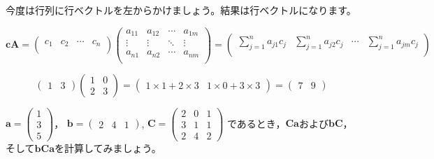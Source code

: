 \documentclass{ltjsbook}
\begin{document}
今度は行列に行ベクトルを左からかけましょう。結果は行ベクトルになります。

\begin{equation*}
	\bm{c} \bm{A} =
	\begin{pmatrix}
		c_1 & c_2 & \cdots & c_n \\
	\end{pmatrix}
	\begin{pmatrix}
		a_{11} & a_{12} & \cdots & a_{1m} \\
		\vdots & \vdots & \ddots & \vdots \\
		a_{n1} & a_{n2} & \cdots & a_{nm} \\
	\end{pmatrix}
	=
	\begin{pmatrix}
		\displaystyle{\sum_{j=1}^{n}a_{j1}c_{j}} & \displaystyle{\sum_{j=1}^{n} a_{j2}c_{j}} & \cdots & \displaystyle{\sum_{j=1}^{n} a_{jm}c_{j}} \\
	\end{pmatrix}
\end{equation*}

\begin{equation*}
	\begin{pmatrix}
		1 & 3
	\end{pmatrix}
	\begin{pmatrix}
		1 & 0 \\
		2 & 3
	\end{pmatrix}
	=
	\begin{pmatrix}
		1 \times 1 + 2 \times 3 & 1\times 0+3 \times 3
	\end{pmatrix}
	=
	\begin{pmatrix}
		7 & 9
	\end{pmatrix}
\end{equation*}

\begin{reidai}{}{}

	$\bm{a} = \begin{pmatrix} 1  \\ 3 \\ 5 \end{pmatrix}$，
	$\bm{b} = \begin{pmatrix} 2 & 4 & 1\end{pmatrix}$,
	$\bm{C} = \begin{pmatrix} 2 & 0 & 1 \\ 3 & 1 & 1 \\ 2 & 4 & 2 \end{pmatrix}$
	であるとき，$\bm{Ca}$および$\bm{bC}$，そして$\bm{bCa}$を計算してみましょう。

\end{reidai}
\end{document}
